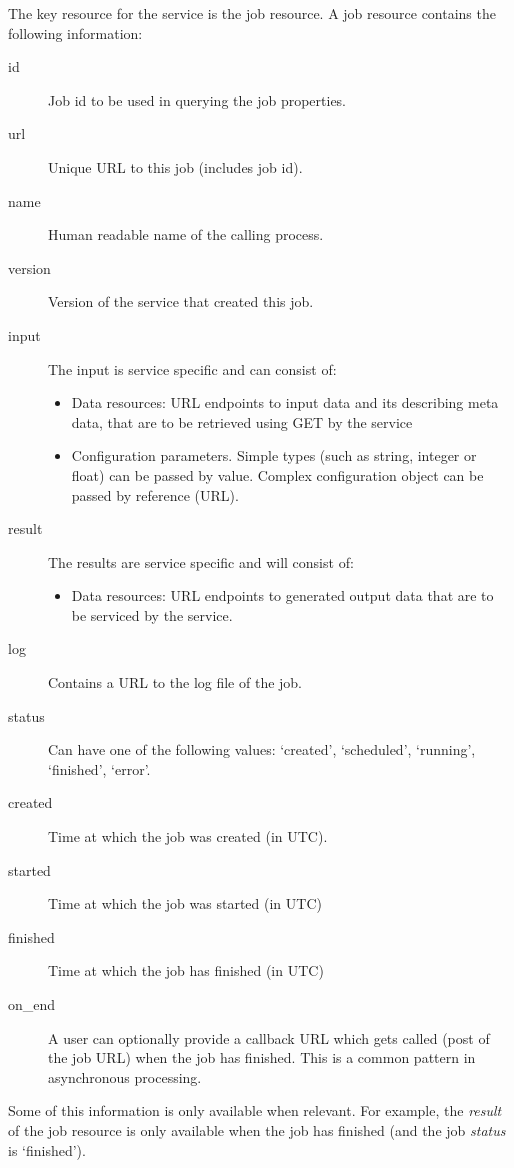 \documentclass[a4paper]{article}
\begin{document}
The key resource for the service is the job resource. A job resource contains
the following information:
\begin{description}
  \item[id] Job id to be used in querying the job properties.
  \item[url] Unique URL to this job (includes job id).
  \item[name] Human readable name of the calling process.
  \item[version] Version of the service that created this job.
  \item[input] The input is service specific and can consist of:
    \begin{itemize}
      \item Data resources: URL endpoints to input data and its describing meta data, that are to be
      retrieved using GET by the service
      \item Configuration parameters. Simple types (such as string, integer or
      float) can be passed by value. Complex configuration object can be passed
      by reference (URL). 
    \end{itemize}
  \item[result] The results are service specific and will consist of:
    \begin{itemize}
      \item Data resources: URL endpoints to generated output data that are to
      be serviced by the service.
    \end{itemize}
  \item[log] Contains a URL to the log file of the job. 
  \item[status] Can have one of the following values: `created', `scheduled',
  `running', `finished', `error'.
  \item[created] Time at which the job was created (in UTC).
  \item[started] Time at which the job was started (in UTC)
  \item[finished] Time at which the job has finished (in UTC)
  \item[on\_end] A user can optionally provide a callback URL which gets called
  (post of the job URL) when the job has finished. This is a common pattern in asynchronous processing.
\end{description}
Some of this information is only available when relevant. For example, the
\emph{result} of the job resource is only available when the job has finished
(and the job \emph{status} is `finished'). 
\end{document}
